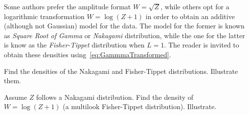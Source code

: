 Some authors\cite{IterativeWeightedMaximumLikelihoodDenoising} prefer the amplitude format $W=\sqrt{Z}$, while others\cite{Santos2017} opt for a logarithmic transformation $W=\log(Z+1)$ in order to obtain an additive (although not Gaussian) model for the data.
The model for the former is known as \textit{Square Root of Gamma} or \textit{Nakagami} distribution,
while the one for the latter is know as the \textit{Fisher-Tippet} distribution when $L=1$.
The reader is invited to obtain these densities using~\eqref{eq:GammmaTransformed}.

\begin{exer}
Find the densities of the Nakagami and Fisher-Tippet distributions.
Illustrate them.
\end{exer}

\begin{exer}
Assume $Z$ follows a Nakagami distribution.
Find the density of $W=\log(Z+1)$ (a multilook Fisher-Tippet distribution).
Illustrate.
\end{exer}
